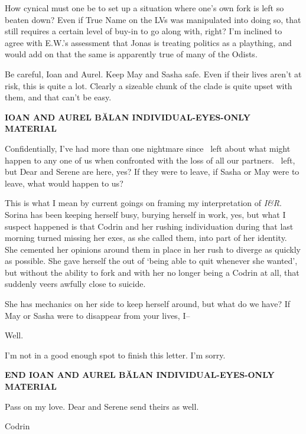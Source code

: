 How cynical must one be to set up a situation where one's own fork is left so beaten down? Even if True Name on the LVs was manipulated into doing so, that still requires a certain level of buy-in to go along with, right? I'm inclined to agree with E.W.'s assessment that Jonas is treating politics as a plaything, and would add on that the same is apparently true of many of the Odists.

Be careful, Ioan and Aurel. Keep May and Sasha safe. Even if their lives aren't at risk, this is quite a lot. Clearly a sizeable chunk of the clade is quite upset with them, and that can't be easy.

\begin{center}
\textbf{IOAN AND AUREL BĂLAN INDIVIDUAL-EYES-ONLY MATERIAL}
\end{center}

Confidentially, I've had more than one nightmare since \Partner\ left about what might happen to any one of us when confronted with the loss of all our partners. \Partner\ left, but Dear and Serene are here, yes? If they were to leave, if Sasha or May were to leave, what would happen to us?

This is what I mean by current goings on framing my interpretation of \emph{I\&R}. Sorina has been keeping herself busy, burying herself in work, yes, but what I suspect happened is that Codrin and her rushing individuation during that last morning turned missing her exes, as she called them, into part of her identity. She cemented her opinions around them in place in her rush to diverge as quickly as possible. She gave herself the out of `being able to quit whenever she wanted', but without the ability to fork and with her no longer being a Codrin at all, that suddenly veers awfully close to suicide.

She has mechanics on her side to keep herself around, but what do we have? If May or Sasha were to disappear from your lives, I--

Well.

I'm not in a good enough spot to finish this letter. I'm sorry.

\begin{center}
\textbf{END IOAN AND AUREL BĂLAN INDIVIDUAL-EYES-ONLY MATERIAL}
\end{center}

Pass on my love. Dear and Serene send theirs as well.

Codrin
